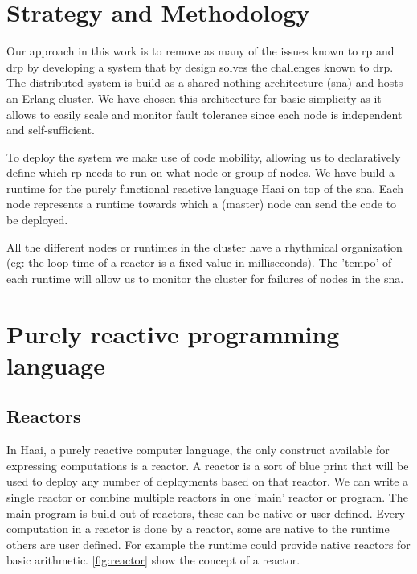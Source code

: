 \documentclass[a4paper]{book}
\begin{document}
\chapter{Strategy and Methodology}

Our approach in this work is to remove as many of the issues known to rp and drp by developing a system that by design solves the challenges known to drp. The distributed system is build as a shared nothing architecture (sna) and hosts an Erlang cluster. We have chosen this architecture for basic simplicity as it allows to easily scale and monitor fault tolerance since each node is independent and self-sufficient.

To deploy the system we make use of code mobility, allowing us to declaratively define which rp needs to run on what node or group of nodes. We have build a runtime for the purely functional reactive language Haai on top of the sna. Each node represents a runtime towards which a (master) node can send the code to be deployed.

All the different nodes or runtimes in the cluster have a rhythmical organization (eg: the loop time of a reactor is a fixed value in milliseconds). The 'tempo' of each runtime will allow us to monitor the cluster for failures of nodes in the sna.  

\chapter{Purely reactive programming language}
\section{Reactors}
In Haai, a purely reactive computer language, the only construct available for expressing computations is a reactor. A reactor is a sort of blue print that will be used to deploy any number of deployments based on that reactor. We can write a single reactor or combine multiple reactors in one 'main' reactor or program. The main program is build out of reactors, these can be native or user defined. Every computation in a reactor is done by a reactor, some are native to the runtime others are user defined. For example the runtime could provide native reactors for basic arithmetic. \ref{fig:reactor} show the concept of a reactor.
\end{document}
